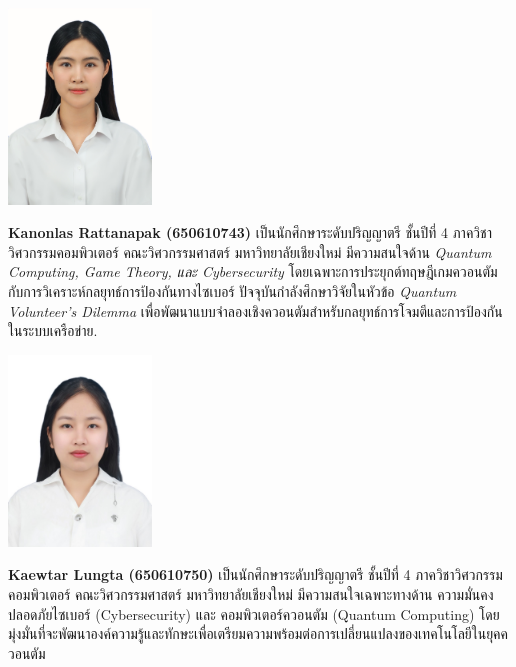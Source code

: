 \documentclass[semifinal]{cpecmu}
\author{นางสาวกนลลัส รัตนภาค}{Kanonlas Rattanapak}{650610743}
\author{นางสาวแก้วตา ลุงต๊ะ}{Kaewtar Lungta}{650610750}
\author{นายธีระพันธุ์ พันธุ์วรรธนะสิน}{Theeraphan Phanwattanasin}{650610773}
\begin{document}


\pagestyle{empty}\cleardoublepage
\normalspacing \setcounter{page}{1}  \pagestyle{cpecmu}





\ifproject

\fi



\ifproject
\normalspacing
\appendix


\ifglossary\glossarypage\fi

\ifindex\indexpage\fi

\begin{biosketch}
\begin{center}
  \includegraphics[width=1.5in]{0743.jpeg}
\end{center}
\textbf{Kanonlas Rattanapak (650610743)} เป็นนักศึกษาระดับปริญญาตรี ชั้นปีที่ 4 
ภาควิชาวิศวกรรมคอมพิวเตอร์ คณะวิศวกรรมศาสตร์ มหาวิทยาลัยเชียงใหม่
มีความสนใจด้าน \textit{Quantum Computing, Game Theory, และ Cybersecurity}
โดยเฉพาะการประยุกต์ทฤษฎีเกมควอนตัมกับการวิเคราะห์กลยุทธ์การป้องกันทางไซเบอร์
ปัจจุบันกำลังศึกษาวิจัยในหัวข้อ \textit{Quantum Volunteer's Dilemma}
เพื่อพัฒนาแบบจำลองเชิงควอนตัมสำหรับกลยุทธ์การโจมตีและการป้องกันในระบบเครือข่าย.

\begin{center}
  \includegraphics[width=1.5in]{0750.jpg}
\end{center}
\textbf{Kaewtar Lungta (650610750)} เป็นนักศึกษาระดับปริญญาตรี ชั้นปีที่ 4 
ภาควิชาวิศวกรรมคอมพิวเตอร์ คณะวิศวกรรมศาสตร์ มหาวิทยาลัยเชียงใหม่ มีความสนใจเฉพาะทางด้าน ความมั่นคงปลอดภัยไซเบอร์ (Cybersecurity) และ คอมพิวเตอร์ควอนตัม (Quantum Computing)
โดยมุ่งมั่นที่จะพัฒนาองค์ความรู้และทักษะเพื่อเตรียมความพร้อมต่อการเปลี่ยนแปลงของเทคโนโลยีในยุคควอนตัม


\end{biosketch}
\end{document}
